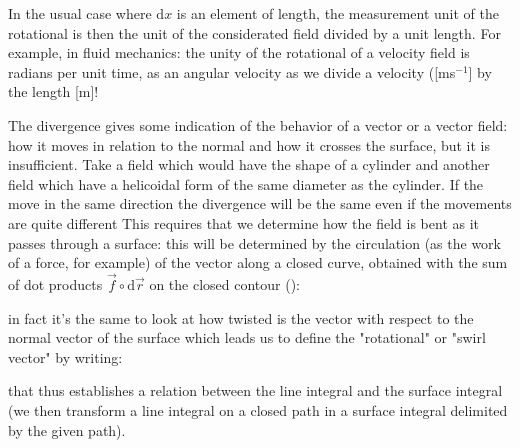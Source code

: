 	In the usual case where $\mathrm{d}x$ is an element of length, the measurement unit of the rotational is then the unit of the considerated field divided by a unit length. For example, in fluid mechanics: the unity of the rotational of a velocity field is radians per unit time, as an angular velocity as we divide a velocity ([ms$^{-1}$] by the length [m]!
	
	The divergence gives some indication of the behavior of a vector or a vector field: how it moves in relation to the normal and how it crosses the surface, but it is insufficient. Take a field which would have the shape of a cylinder and another field which have a helicoidal form of the same diameter as the cylinder. If the move  in the same direction the divergence will be the same even if the movements are quite different This requires that we determine how the field is bent as it passes through a surface: this will be determined by the circulation (as the work of a force, for example) of the vector along a closed curve, obtained with the sum of dot products $\vec{f}\circ \mathrm{d}\vec{r}$ on the closed contour ():
	
	in fact it's the same to look at how twisted is the vector with respect to the normal vector of the surface which leads us to define the "rotational" or "swirl vector" by writing:
	
	that thus establishes a relation between the line integral and the surface integral (we then transform a line integral on a closed path in a surface integral delimited by the given path).
	
